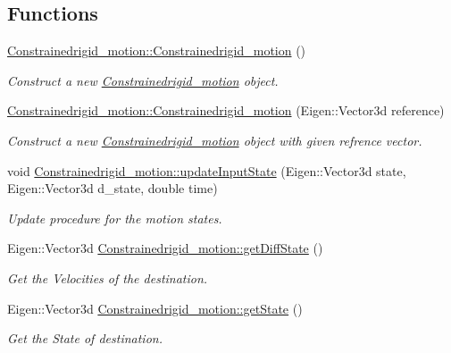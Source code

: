 \subsection*{Functions}
\begin{DoxyCompactItemize}
\item 
\mbox{\label{group__RigidMotion_ga2754df22fa5a20dfc6094c33258f13e2}} 
\hyperlink{group__RigidMotion_ga2754df22fa5a20dfc6094c33258f13e2}{Constrainedrigid\+\_\+motion\+::\+Constrainedrigid\+\_\+motion} ()
\begin{DoxyCompactList}\small\item\em Construct a new \hyperlink{classConstrainedrigid__motion}{Constrainedrigid\+\_\+motion} object. \end{DoxyCompactList}\item 
\hyperlink{group__RigidMotion_ga1db11e0353c9a9f08e78fb935b0cee96}{Constrainedrigid\+\_\+motion\+::\+Constrainedrigid\+\_\+motion} (Eigen\+::\+Vector3d reference)
\begin{DoxyCompactList}\small\item\em Construct a new \hyperlink{classConstrainedrigid__motion}{Constrainedrigid\+\_\+motion} object with given refrence vector. \end{DoxyCompactList}\item 
void \hyperlink{group__RigidMotion_ga67803463eb8fcb37eec415292fa6a13f}{Constrainedrigid\+\_\+motion\+::update\+Input\+State} (Eigen\+::\+Vector3d state, Eigen\+::\+Vector3d d\+\_\+state, double time)
\begin{DoxyCompactList}\small\item\em Update procedure for the motion states. \end{DoxyCompactList}\item 
Eigen\+::\+Vector3d \hyperlink{group__RigidMotion_ga8540758697945dc27502fcb557bb4871}{Constrainedrigid\+\_\+motion\+::get\+Diff\+State} ()
\begin{DoxyCompactList}\small\item\em Get the Velocities of the destination. \end{DoxyCompactList}\item 
Eigen\+::\+Vector3d \hyperlink{group__RigidMotion_ga1a34b67dd58d3137628811dfab7f54a1}{Constrainedrigid\+\_\+motion\+::get\+State} ()
\begin{DoxyCompactList}\small\item\em Get the State of destination. \end{DoxyCompactList}\item 

\end{DoxyCompactItemize}
